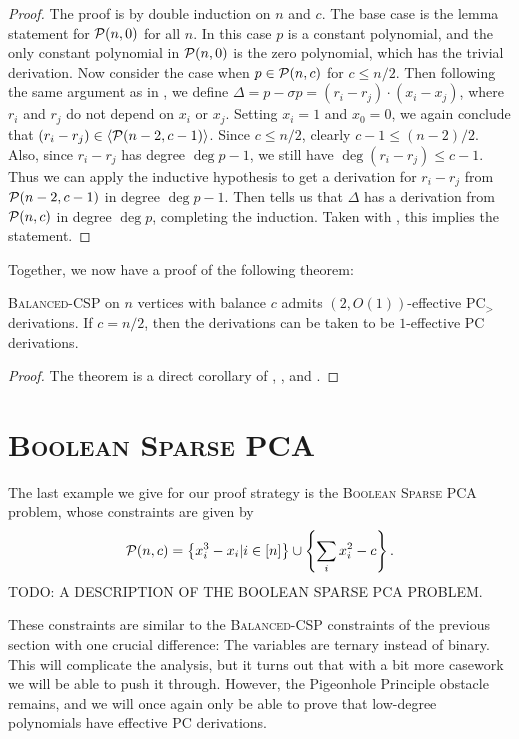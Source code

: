 \begin{proof}
The proof is by double induction on $n$ and $c$. The base case is the lemma statement for $\mathcal P(n,0)$ for all $n$. In this case $p$ is a constant polynomial, and the only constant polynomial in $\mathcal P(n,0)$ is the zero polynomial, which has the trivial derivation. Now consider the case when $p \in \mathcal P(n,c)$ for $c \leq n/2$. Then following the same argument as in , we define $\Delta = p - \sigma p = (r_i - r_j)\cdot (x_i - x_j)$, where $r_i$ and $r_j$ do not depend on $x_i$ or $x_j$. Setting $x_i = 1$ and $x_0 = 0$, we again conclude that $(r_i - r_j) \in \langle \mathcal P(n-2,c-1) \rangle$. Since $c \leq n/2$, clearly $c-1 \leq (n-2)/2$. Also, since $r_i - r_j$ has degree $\deg p - 1$, we still have $\deg (r_i - r_j) \leq c-1$. Thus we can apply the inductive hypothesis to get a derivation for $r_i - r_j$ from $\mathcal P(n-2,c-1)$ in degree $\deg p - 1$. Then  tells us that $\Delta$ has a derivation from $\mathcal P(n,c)$ in degree $\deg p$, completing the induction. Taken with , this implies the statement. 
\end{proof}
Together, we now have a proof of the following theorem:
\begin{theorem}
\textsc{Balanced-CSP} on $n$ vertices with balance $c$ admits $(2,O(1))$-effective PC$_>$ derivations. If $c = n/2$, then the derivations can be taken to be $1$-effective PC derivations.
\end{theorem}
\begin{proof}
The theorem is a direct corollary of , , and .
\end{proof}

\section{\textsc{Boolean Sparse PCA}}
The last example we give for our proof strategy is the \textsc{Boolean Sparse PCA} problem, whose constraints are given by 
\[\mathcal P(n,c) = \left\{x_i^3 - x_i | i \in [n]\right\} \cup \left\{\sum_i x_i^2 - c\right\}.\]
TODO: A DESCRIPTION OF THE BOOLEAN SPARSE PCA PROBLEM.

These constraints are similar to the \textsc{Balanced-CSP} constraints of the previous section with one crucial difference: The variables are ternary instead of binary.
This will complicate the analysis, but it turns out that with a bit more casework we will be able to push it through.
However, the Pigeonhole Principle obstacle remains, and we will once again only be able to prove that low-degree polynomials have effective PC derivations.
